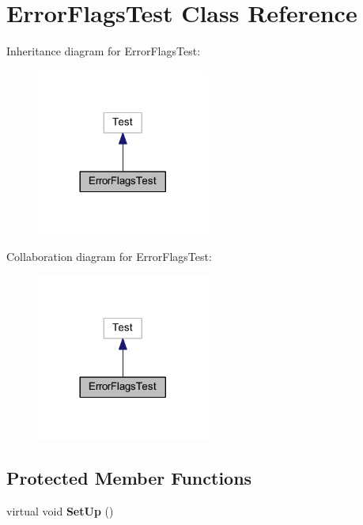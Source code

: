 \hypertarget{class_error_flags_test}{}\section{Error\+Flags\+Test Class Reference}
\label{class_error_flags_test}


Inheritance diagram for Error\+Flags\+Test\+:\nopagebreak
\begin{figure}[H]
\begin{center}
\leavevmode
\includegraphics[width=161pt]{class_error_flags_test__inherit__graph}
\end{center}
\end{figure}


Collaboration diagram for Error\+Flags\+Test\+:\nopagebreak
\begin{figure}[H]
\begin{center}
\leavevmode
\includegraphics[width=161pt]{class_error_flags_test__coll__graph}
\end{center}
\end{figure}
\subsection*{Protected Member Functions}
\begin{DoxyCompactItemize}
\item 
\hypertarget{class_error_flags_test_a14e4a93a156e1cb9e96b26d2a1dae27f}{}\label{class_error_flags_test_a14e4a93a156e1cb9e96b26d2a1dae27f} 
virtual void {\bfseries Set\+Up} ()
\end{DoxyCompactItemize}
